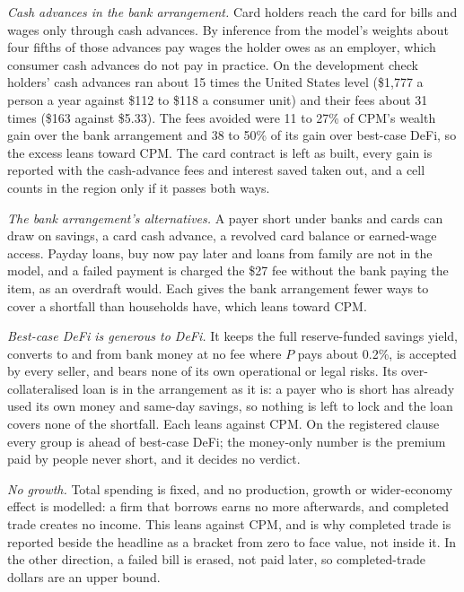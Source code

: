 \emph{Cash advances in the bank arrangement.} Card holders reach the card for bills and wages only through cash
advances. By inference from the model's weights about four fifths of those advances pay wages the holder owes
as an employer, which consumer cash
advances do not pay in practice. On the development check holders' cash advances ran about 15 times the United
States level (\$1,777 a person a year against \$112 to \$118 a consumer unit) and their fees about 31 times (\$163
against \$5.33). The fees avoided were 11 to 27\% of CPM's wealth gain over the bank arrangement and 38 to 50\% of its
gain over best-case DeFi, so the excess leans toward CPM. The card contract is left as built, every gain is
reported with the cash-advance fees and interest saved taken out, and a cell counts in the region only if it passes
both ways.

\emph{The bank arrangement's alternatives.} A payer short under banks and cards can draw on savings, a card
cash advance, a revolved card balance or earned-wage access. Payday loans, buy now pay later and loans from family
are not in the model, and a failed payment is charged the \$27 fee without the bank paying the item, as an
overdraft would. Each gives the bank arrangement fewer ways to cover a shortfall than households have,
which leans toward CPM.

\emph{Best-case DeFi is generous to DeFi.} It keeps the full reserve-funded savings yield, converts to and from bank
money at no fee where $P$ pays about 0.2\%, is accepted by every seller, and bears none of its own
operational or legal risks. Its over-collateralised loan is in the arrangement as it is: a payer who is short has
already used its own money and same-day savings, so nothing is left to lock and the loan covers none of the
shortfall. Each leans against CPM. On the registered clause every group is ahead of best-case DeFi; the
money-only number is the premium paid by people never short, and it decides no verdict.

\emph{No growth.} Total spending is fixed, and no production, growth or wider-economy effect is modelled: a firm that
borrows earns no more afterwards, and completed trade creates no income. This leans against CPM, and is why
completed trade is reported beside the headline as a bracket from zero to face value, not inside it. In the
other direction, a failed bill is erased, not paid later, so completed-trade dollars are an upper bound.

